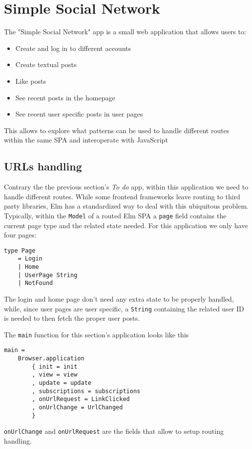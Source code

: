\section{Simple Social Network}
The "Simple Social Network" app is a small web application that allows users to:
\begin{itemize}
    \item Create and log in to different accounts
    \item Create textual posts
    \item Like posts
    \item See recent posts in the homepage
    \item See recent user specific posts in user pages
\end{itemize}
This allows to explore what patterns can be used to handle different routes within the same SPA and interoperate with JavaScript

\subsection{URLs handling}
Contrary the the previous section's \textit{To do} app, within this application we need to handle different routes. While some frontend frameworks leave routing to third party libraries, Elm has a standardized way to deal with this ubiquitous problem.\\

Typically, within the \texttt{Model} of a routed Elm SPA a \texttt{page} field contains the current page type and the related state needed. For this application we only have four pages:
\begin{verbatim}
type Page
    = Login
    | Home
    | UserPage String
    | NotFound
\end{verbatim}
The login and home page don't need any extra state to be properly handled, while, since user pages are user specific, a \texttt{String} containing the related user ID is needed to then fetch the proper user posts.

The \texttt{main} function for this section's application looks like this

\begin{verbatim}
main =
    Browser.application
        { init = init
        , view = view
        , update = update
        , subscriptions = subscriptions
        , onUrlRequest = LinkClicked
        , onUrlChange = UrlChanged
        }
\end{verbatim}

\texttt{onUrlChange} and \texttt{onUrlRequest} are the fields that allow to setup routing handling.\\

